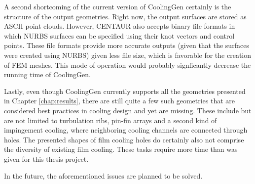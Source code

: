 \documentclass[a4paper, 11pt]{report}
\theoremstyle{definition}
\begin{document}
		A second shortcoming of the current version of CoolingGen certainly is the structure of the output geometries. Right now, the output surfaces are stored as ASCII point clouds. However, CENTAUR also accepts binary file formats in which NURBS surfaces can be specified using their knot vectors and control points. These file formats provide more accurate outputs (given that the surfaces were created using NURBS) given less file size, which is favorable for the creation of FEM meshes. This mode of operation would probably signficantly decrease the running time of CoolingGen.

		Lastly, even though CoolingGen currently supports all the geometries presented in Chapter \ref{chap:results}, there are still quite a few such geometries that are considered best practices in cooling design and yet are missing. These include but are not limited to turbulation ribs, pin-fin arrays and a second kind of impingement cooling, where neighboring cooling channels are connected through holes. The presented shapes of film cooling holes do certainly also not comprise the diversity of existing film cooling. These tasks require more time than was given for this thesis project.

		In the future, the aforementioned issues are planned to be solved.


\printbibliography[heading=bibnumbered, title=References]
\end{document}
